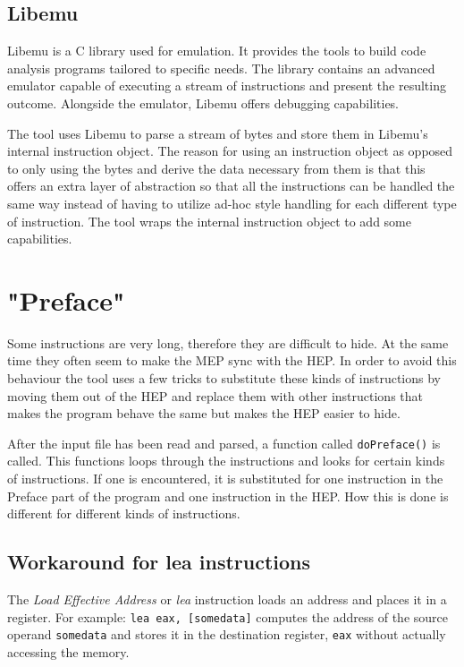 \documentclass[11pt,twoside]{eitExjobb}
\begin{document}
\subsection{Libemu}
Libemu is a C library used for emulation. It provides the tools to build code analysis programs tailored to specific needs. The library contains an advanced emulator capable of executing a stream of instructions and present the resulting outcome. Alongside the emulator, Libemu offers debugging capabilities.

The tool uses Libemu to parse a stream of bytes and store them in Libemu's internal instruction object. The reason for using an instruction object as opposed to only using the bytes and derive the data necessary from them is that this offers an extra layer of abstraction so that all the instructions can be handled the same way instead of having to utilize ad-hoc style handling for each different type of instruction. The tool wraps the internal instruction object to add some capabilities.\cite{libemu}

\section{"Preface"}
Some instructions are very long, therefore they are difficult to hide. At the same time they often seem to make the MEP sync with the HEP. In order to avoid this behaviour the tool uses a few tricks to substitute these kinds of instructions by moving them out of the HEP and replace them with other instructions that makes the program behave the same but makes the HEP easier to hide. 

After the input file has been read and parsed, a function called \texttt{doPreface()} is called. This functions loops through the instructions and looks for certain kinds of instructions. If one is encountered, it is substituted for one instruction in the Preface part of the program and one instruction in the HEP. How this is done is different for different kinds of instructions.  

\subsection{Workaround for lea instructions}
The \emph{Load Effective Address} or \emph{lea} instruction loads an address and places it in a register. For example: \texttt{lea eax, [somedata]} computes the address of the source operand \texttt{somedata} and stores it in the destination register, \texttt{eax} without actually accessing the memory. 
\end{document}
